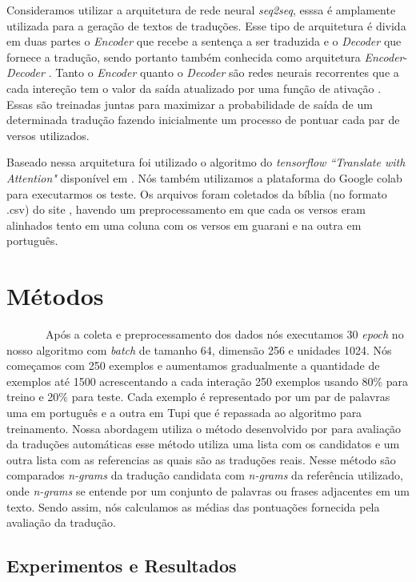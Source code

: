 \documentclass[12pt]{article}
\begin{document}
Consideramos utilizar a  arquitetura de rede neural \textit{seq2seq}, esssa é amplamente utilizada para a geração de textos de traduções. Esse tipo de arquitetura é divida em duas partes o \textit{Encoder} que recebe a sentença a ser traduzida e o \textit{Decoder} que fornece a tradução, sendo portanto também conhecida como arquitetura \textit{Encoder}-\textit{Decoder} \cite{DBLP:journals/corr/ChoMGBSB14}. Tanto o \textit{Encoder} quanto o \textit{Decoder} são redes neurais recorrentes que a cada intereção tem o valor da saída atualizado por uma função de ativação \cite{DBLP:journals/corr/ChoMGBSB14}. Essas são treinadas juntas para maximizar a probabilidade de saída de um determinada tradução fazendo inicialmente um processo de pontuar cada par de versos utilizados.


Baseado nessa arquitetura foi  utilizado o algoritmo do \textit{tensorflow ``Translate with Attention"} disponível em \cite{tensorflow}. Nós também utilizamos a plataforma do Google colab \cite{google} para executarmos os teste.
Os arquivos foram coletados da bíblia (no formato .csv) do site \cite{angelo}, havendo um preprocessamento em que cada os versos eram alinhados tento em uma coluna com os versos em guarani e na outra em português.

\section{Métodos}

~~~~~~~Após a coleta e preprocessamento dos dados nós executamos 30 \textit{epoch} no nosso algoritmo com \textit{batch} de tamanho 64, dimensão 256 e unidades 1024. Nós começamos com 250 exemplos e aumentamos gradualmente a quantidade de exemplos até 1500 acrescentando a cada interação 250 exemplos usando 80\% para treino e 20\% para teste. Cada exemplo é representado por um par de palavras uma em português e a outra em Tupi que é repassada ao algoritmo para treinamento. Nossa abordagem utiliza o método desenvolvido por \cite{papineni2002bleu} para avaliação da traduções automáticas esse método utiliza uma lista com os candidatos e um outra lista com as referencias as quais são as traduções reais. Nesse método são comparados \textit{n-grams}
da tradução candidata com \textit{n-grams} da referência utilizado, onde \textit{n-grams} se entende por um conjunto de palavras ou frases adjacentes em um texto. Sendo assim, nós calculamos as médias das pontuações fornecida pela avaliação da tradução.

\subsection{Experimentos e Resultados}
\end{document}
